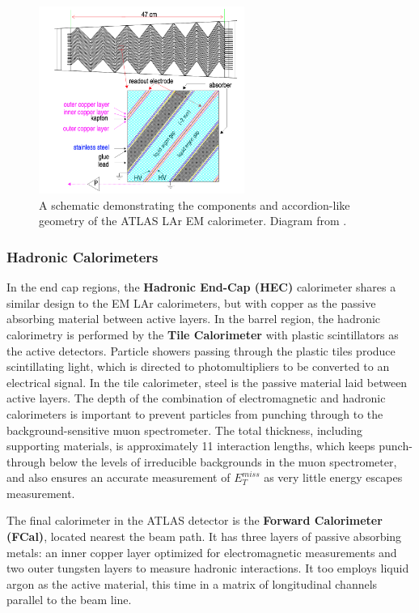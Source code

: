 \begin{figure}[H]
    \centering
    \includegraphics[width=0.6\textwidth]{Figures/2/accordion.png}
    \caption{A schematic demonstrating the components and accordion-like geometry of the ATLAS LAr EM calorimeter. Diagram from \cite{Accordion}.}
    \label{fig:accord}
\end{figure}

\subsubsection{Hadronic Calorimeters}
In the end cap regions, the \textbf{Hadronic End-Cap (HEC)} calorimeter shares a similar design to the EM LAr calorimeters, but with copper as the passive absorbing material between active layers. In the barrel region, the hadronic calorimetry is performed by the \textbf{Tile Calorimeter} with plastic scintillators as the active detectors. Particle showers passing through the plastic tiles produce scintillating light, which is directed to photomultipliers to be converted to an electrical signal. In the tile calorimeter, steel is the passive material laid between active layers. The depth of the combination of electromagnetic and hadronic calorimeters is important to prevent particles from punching through to the background-sensitive muon spectrometer. The total thickness, including supporting materials, is approximately 11 interaction lengths, which keeps punch-through below the levels of irreducible backgrounds in the muon spectrometer, and also ensures an accurate measurement of $E^{miss}_T$ as very little energy escapes measurement.

The final calorimeter in the ATLAS detector is the \textbf{Forward Calorimeter (FCal)}, located nearest the beam path. It has three layers of passive absorbing metals: an inner copper layer optimized for electromagnetic measurements and two outer tungsten layers to measure hadronic interactions. It too employs liquid argon as the active material, this time in a matrix of longitudinal channels parallel to the beam line.

